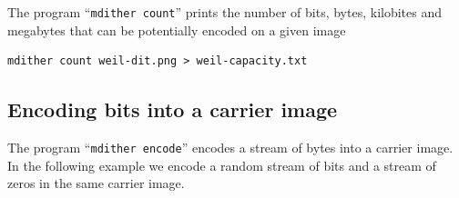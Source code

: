 The program ``\verb+mdither count+'' prints the number of bits, bytes, kilobites
and megabytes that can be potentially encoded on a given image

\begin{verbatim}
mdither count weil-dit.png > weil-capacity.txt
\end{verbatim}

\subsection{Encoding bits into a carrier image}

The program ``\verb+mdither encode+'' encodes a stream of bytes into a
carrier image.  In the following example we encode a random stream of bits
and a stream of zeros in the same carrier image.

